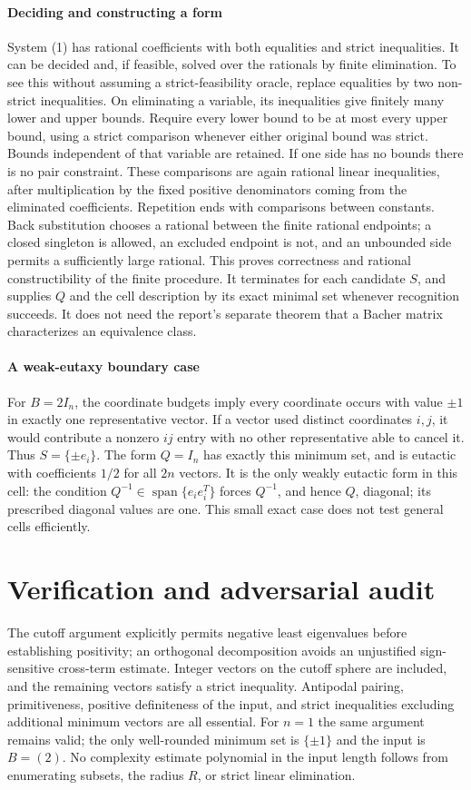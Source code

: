 \documentclass[11pt]{article}
\begin{document}
\paragraph{Deciding and constructing a form}
System (1) has rational coefficients with both equalities and strict inequalities. It can be decided and, if feasible, solved over the rationals by finite elimination. To see this without assuming a strict-feasibility oracle, replace equalities by two non-strict inequalities. On eliminating a variable, its inequalities give finitely many lower and upper bounds. Require every lower bound to be at most every upper bound, using a strict comparison whenever either original bound was strict. Bounds independent of that variable are retained. If one side has no bounds there is no pair constraint. These comparisons are again rational linear inequalities, after multiplication by the fixed positive denominators coming from the eliminated coefficients. Repetition ends with comparisons between constants. Back substitution chooses a rational between the finite rational endpoints; a closed singleton is allowed, an excluded endpoint is not, and an unbounded side permits a sufficiently large rational. This proves correctness and rational constructibility of the finite procedure. It terminates for each candidate $S$, and supplies $Q$ and the cell description by its exact minimal set whenever recognition succeeds. It does not need the report's separate theorem that a Bacher matrix characterizes an equivalence class.

\paragraph{A weak-eutaxy boundary case}
For $B=2I_n$, the coordinate budgets imply every coordinate occurs with value $\pm1$ in exactly one representative vector. If a vector used distinct coordinates $i,j$, it would contribute a nonzero $ij$ entry with no other representative able to cancel it. Thus $S=\{\pm e_i\}$. The form $Q=I_n$ has exactly this minimum set, and is eutactic with coefficients $1/2$ for all $2n$ vectors. It is the only weakly eutactic form in this cell: the condition $Q^{-1}\in\operatorname{span}\{e_ie_i^T\}$ forces $Q^{-1}$, and hence $Q$, diagonal; its prescribed diagonal values are one. This small exact case does not test general cells efficiently.

\section{Verification and adversarial audit}
The cutoff argument explicitly permits negative least eigenvalues before establishing positivity; an orthogonal decomposition avoids an unjustified sign-sensitive cross-term estimate. Integer vectors on the cutoff sphere are included, and the remaining vectors satisfy a strict inequality. Antipodal pairing, primitiveness, positive definiteness of the input, and strict inequalities excluding additional minimum vectors are all essential. For $n=1$ the same argument remains valid; the only well-rounded minimum set is $\{\pm1\}$ and the input is $B=(2)$. No complexity estimate polynomial in the input length follows from enumerating subsets, the radius $R$, or strict linear elimination.
\end{document}
